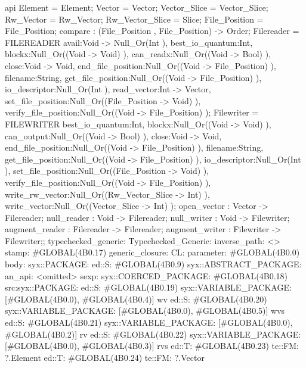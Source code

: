 api {
    Element  = Element;
    Vector  = Vector;
    Vector_Slice  = Vector_Slice;
    Rw_Vector  = Rw_Vector;
    Rw_Vector_Slice  = Slice;
    File_Position  = File_Position;
    compare : (File_Position , File_Position) -> Order;
        Filereader
        = FILEREADER        {avail:Void -> Null_Or(Int ), best_io_quantum:Int, blockx:Null_Or((Void -> Void) ),
                            can_readx:Null_Or((Void -> Bool) ), close:Void -> Void,
                            end_file_position:Null_Or((Void -> File_Position) ), filename:String,
                            get_file_position:Null_Or((Void -> File_Position) ), io_descriptor:Null_Or(Int ),
                            read_vector:Int -> Vector, set_file_position:Null_Or((File_Position -> Void) ),
                            verify_file_position:Null_Or((Void -> File_Position) )};
        Filewriter
        = FILEWRITER
                {best_io_quantum:Int, blockx:Null_Or((Void -> Void) ), can_output:Null_Or((Void -> Bool) ),
                close:Void -> Void, end_file_position:Null_Or((Void -> File_Position) ), filename:String,
                get_file_position:Null_Or((Void -> File_Position) ), io_descriptor:Null_Or(Int ),
                set_file_position:Null_Or((File_Position -> Void) ),
                verify_file_position:Null_Or((Void -> File_Position) ),
                write_rw_vector:Null_Or((Rw_Vector_Slice -> Int) ), write_vector:Null_Or((Vector_Slice -> Int) )};
    open_vector : Vector -> Filereader;
    null_reader : Void -> Filereader;
    null_writer : Void -> Filewriter;
    augment_reader : Filereader -> Filereader;
    augment_writer : Filewriter -> Filewriter;};
typechecked_generic:
Typechecked_Generic:
inverse_path: <>
stamp: #GLOBAL(4B0.17)
generic_closure:
CL:
parameter: #GLOBAL(4B0.0)
body: syx::PACKAGE:
        ed::S: #GLOBAL(4B0.9)
            syx::ABSTRACT_PACKAGE:
                an_api: <omitted>
                sexp:
                    syx::COERCED_PACKAGE:
                        #GLOBAL(4B0.18)
                         src:syx::PACKAGE:
                                ed::S: #GLOBAL(4B0.19) syx::VARIABLE_PACKAGE: [#GLOBAL(4B0.0), #GLOBAL(4B0.4)] wv
                                ed::S: #GLOBAL(4B0.20) syx::VARIABLE_PACKAGE: [#GLOBAL(4B0.0), #GLOBAL(4B0.5)] wvs
                                ed::S: #GLOBAL(4B0.21) syx::VARIABLE_PACKAGE: [#GLOBAL(4B0.0), #GLOBAL(4B0.2)] rv
                                ed::S: #GLOBAL(4B0.22) syx::VARIABLE_PACKAGE: [#GLOBAL(4B0.0), #GLOBAL(4B0.3)] rvs
                                ed::T: #GLOBAL(4B0.23) te::FM: ?.Element
                                ed::T: #GLOBAL(4B0.24) te::FM: ?.Vector
